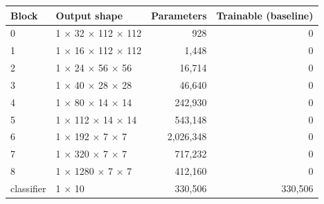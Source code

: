 \begin{tabular}{llrr}
\toprule
Block & Output shape & Parameters & Trainable (baseline) \\
\midrule
0 & 1 $\times$ 32 $\times$ 112 $\times$ 112 & 928 & 0 \\
1 & 1 $\times$ 16 $\times$ 112 $\times$ 112 & 1,448 & 0 \\
2 & 1 $\times$ 24 $\times$ 56 $\times$ 56 & 16,714 & 0 \\
3 & 1 $\times$ 40 $\times$ 28 $\times$ 28 & 46,640 & 0 \\
4 & 1 $\times$ 80 $\times$ 14 $\times$ 14 & 242,930 & 0 \\
5 & 1 $\times$ 112 $\times$ 14 $\times$ 14 & 543,148 & 0 \\
6 & 1 $\times$ 192 $\times$ 7 $\times$ 7 & 2,026,348 & 0 \\
7 & 1 $\times$ 320 $\times$ 7 $\times$ 7 & 717,232 & 0 \\
8 & 1 $\times$ 1280 $\times$ 7 $\times$ 7 & 412,160 & 0 \\
classifier & 1 $\times$ 10 & 330,506 & 330,506 \\
\bottomrule
\end{tabular}
